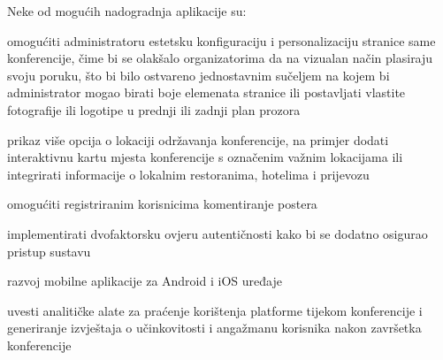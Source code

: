 		Neke od mogućih nadogradnja aplikacije su: 
		\begin{packed_item}
			\item omogućiti administratoru estetsku konfiguraciju i personalizaciju stranice same konferencije, čime bi se olakšalo organizatorima da na vizualan način plasiraju svoju poruku, što bi bilo ostvareno jednostavnim sučeljem na kojem bi administrator mogao birati boje elemenata stranice ili postavljati vlastite fotografije ili logotipe u prednji ili zadnji plan prozora
			\item prikaz više opcija o lokaciji održavanja konferencije, na primjer dodati  interaktivnu kartu mjesta konferencije s označenim važnim lokacijama ili integrirati informacije o lokalnim restoranima, hotelima i prijevozu
			\item omogućiti registriranim korisnicima komentiranje postera
			\item implementirati dvofaktorsku ovjeru autentičnosti kako bi se dodatno osigurao pristup sustavu
			\item razvoj mobilne aplikacije za Android i iOS uređaje
			\item uvesti analitičke alate za praćenje korištenja platforme tijekom konferencije i generiranje izvještaja o učinkovitosti i angažmanu korisnika nakon završetka konferencije
		\end{packed_item}

		\eject
		
